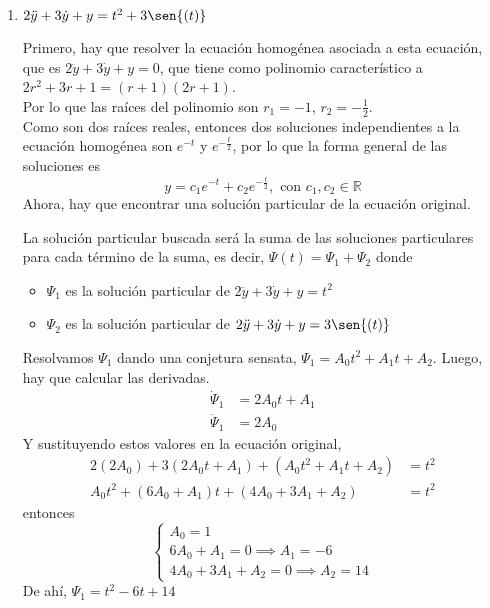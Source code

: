 \documentclass{article}
\begin{document}
\begin{enumerate}
{        }
        \item {
            $2\ddot y+3\dot y+y=t^2+3\sen{(t)}$

            \color{azul}
            Primero, hay que resolver la ecuación homogénea asociada a 
            esta ecuación, que es $2\ddot y+3\dot y+y=0$, que tiene como
            polinomio característico a $2r^2+3r+1 =
            (r+1)(2r+1)$.\\
            Por lo que las raíces del polinomio son $r_1 = -1$, $r_2=-\frac{1}{2}$.\\
            Como son dos raíces reales, entonces dos soluciones
            independientes a la ecuación homogénea son $e^{-t}$ y 
            $e^{-\frac{t}{2}}$, por lo que la forma general de las
            soluciones es
            \[y = c_1e^{-t} + c_2e^{-\frac{t}{2}}, \text{ con }
            c_1, c_2 \in \mathbb{R}\]
            Ahora, hay que encontrar una solución particular de la
            ecuación original.
            
            La solución particular buscada será la suma de las soluciones particulares para cada
            término de la suma, es decir, $\Psi(t)=\Psi_1+\Psi_2$ donde
            \begin{itemize}
            	\item $\Psi_1$ es la solución particular de $2\ddot y+3\dot y+y=t^2$
            	\item $\Psi_2$ es la solución particular de $2\ddot y+3\dot y+y=3\sen{(t)}$
            \end{itemize}
            
            Resolvamos $\Psi_1$ dando una conjetura sensata, $\Psi_1=A_0t^2 + A_1t+A_2$.
            Luego, hay que calcular las derivadas.
            \begin{align*}
            \dot \Psi_1 &= 2A_0t + A_1 \\
            \ddot \Psi_1 &= 2A_0
            \end{align*}
            Y sustituyendo estos valores en la ecuación original, 
            \begin{align*}
				2(2A_0) + 3(2A_0t + A_1)+ (A_0t^2 + A_1t+A_2) &= t^2 \\
				A_0t^2 + (6A_0 + A_1)t+ (4A_0 + 3A_1 + A_2) &= t^2
            \end{align*}    	
            entonces
            \begin{equation*}
            \begin{cases}
            A_0=1 \\
            6A_0 + A_1=0 \implies A_1 = -6\\
            4A_0 + 3A_1 + A_2 = 0 \implies A_2 = 14
            \end{cases}
            \end{equation*}
            De ahí, $\Psi_1 = t^2 -6t + 14$\\
            
}
\end{enumerate}
\end{document}
